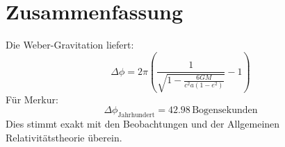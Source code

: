\section{Zusammenfassung}
Die Weber-Gravitation liefert:
\[
\boxed{
\Delta \phi = 2\pi \left( \frac{1}{\sqrt{1 - \frac{6GM}{c^2 a (1-e^2)}}} - 1 \right)
}
\]
Für Merkur:
\[
\boxed{\Delta \phi_{\text{Jahrhundert}} = 42.98\, \text{Bogensekunden}}
\]
Dies stimmt exakt mit den Beobachtungen und der Allgemeinen Relativitätstheorie überein.
